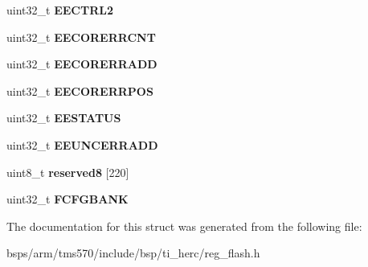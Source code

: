 \begin{DoxyCompactItemize}
\item 
\mbox{\label{structtms570__flash__t_a891330ded210eb8a755f17a50d0daa44}} 
uint32\+\_\+t {\bfseries E\+E\+C\+T\+R\+L2}
\item 
\mbox{\label{structtms570__flash__t_adefd1ff0a4a1f095777b56a61abcf1e4}} 
uint32\+\_\+t {\bfseries E\+E\+C\+O\+R\+E\+R\+R\+C\+NT}
\item 
\mbox{\label{structtms570__flash__t_a8510b5ef3c9ea16fe94589dc8290894e}} 
uint32\+\_\+t {\bfseries E\+E\+C\+O\+R\+E\+R\+R\+A\+DD}
\item 
\mbox{\label{structtms570__flash__t_ab4107f3f7d138cbdb29d5cd1303a490e}} 
uint32\+\_\+t {\bfseries E\+E\+C\+O\+R\+E\+R\+R\+P\+OS}
\item 
\mbox{\label{structtms570__flash__t_a074629218c92af3645d86e16b45d544b}} 
uint32\+\_\+t {\bfseries E\+E\+S\+T\+A\+T\+US}
\item 
\mbox{\label{structtms570__flash__t_a440dca48f1450d67cf172865c72605c1}} 
uint32\+\_\+t {\bfseries E\+E\+U\+N\+C\+E\+R\+R\+A\+DD}
\item 
\mbox{\label{structtms570__flash__t_ac03eee9bb7cb8ccc525dd2e19a44ae6e}} 
uint8\+\_\+t {\bfseries reserved8} \mbox{[}220\mbox{]}
\item 
\mbox{\label{structtms570__flash__t_aa55c7a85b74e9aa53aa435fb51b69b3e}} 
uint32\+\_\+t {\bfseries F\+C\+F\+G\+B\+A\+NK}
\end{DoxyCompactItemize}


The documentation for this struct was generated from the following file\+:\begin{DoxyCompactItemize}
\item 
bsps/arm/tms570/include/bsp/ti\+\_\+herc/reg\+\_\+flash.\+h\end{DoxyCompactItemize}
